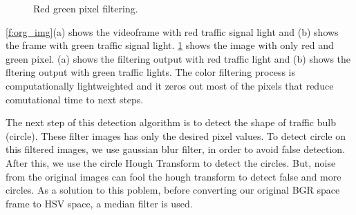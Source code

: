 \begin{figure}[!ht]
\centering
{}

\caption{Red green pixel filtering.}
\label{f:fil_img}
\end{figure}

\ref{f:org_img}(a) shows the videoframe with red traffic signal light and (b) shows the frame with green traffic signal light.
\ref{f:fil_img} shows the image with only red and green pixel.
(a) shows the filtering output with red traffic light and (b) shows the fltering output with green traffic lights.
The color filtering process is computationally lightweighted and it zeros out most of the pixels that reduce comutational time to next steps.

The next step of this detection algorithm is to detect the shape of traffic bulb (circle).
These filter images has only the desired pixel values.
To detect circle on this filtered images, we use gaussian blur filter, in order to avoid false detection.
After this, we use the circle Hough Transform \cite{hough_circle} to detect the circles.
But, noise from the original images can fool the hough transform to detect false and more circles.
As a solution to this poblem, before converting our original BGR space frame to HSV space, a median filter is used.

